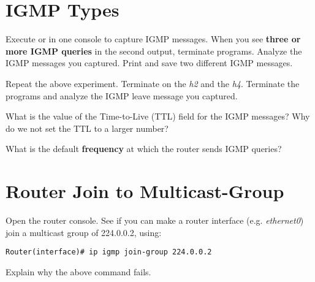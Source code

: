 \documentclass{../UTNetLab}
\begin{document}
\section{IGMP Types}
Execute  or  in one console to capture IGMP messages.
When you see \textbf{three or more IGMP queries} in the second  output, terminate  programs.
Analyze the IGMP messages you captured.
Print and save two different IGMP messages.

Repeat the above experiment.
Terminate  on the \textit{h2} and the \textit{h4}.
Terminate the  programs and analyze the IGMP leave message you captured.

\begin{report}
    \item What is the value of the Time-to-Live (TTL) field for the IGMP messages?
    Why do we not set the TTL to a larger number?

    \item What is the default \textbf{frequency} at which the router sends IGMP queries?
\end{report}

\section{Router Join to Multicast-Group}
Open the router console.
See if you can make a router interface (e.g. \textit{ethernet0}) join a multicast group of 224.0.0.2, using:
\begin{lstlisting}[language={cisco}]
Router(interface)# ip igmp join-group 224.0.0.2
    \end{lstlisting}

\begin{report}
    \item Explain why the above command fails.
\end{report}
\end{document}

